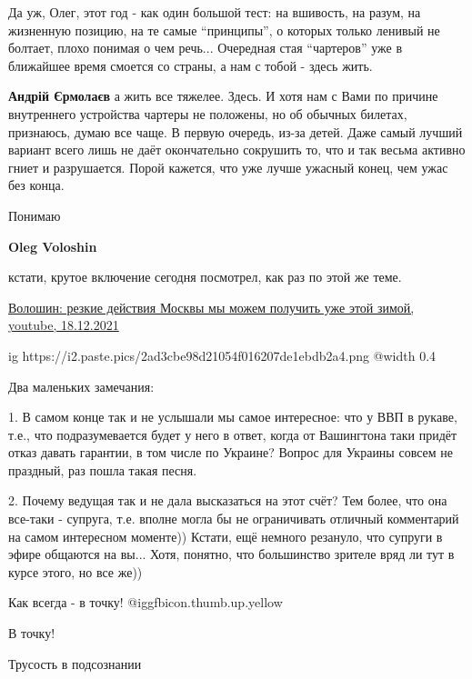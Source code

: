  
 
 
 
 
\zzSecCmt

\begin{itemize} %

Да уж, Олег, этот год - как один большой тест: на вшивость, на разум, на
жизненную позицию, на те самые \enquote{принципы}, о которых только ленивый не болтает,
плохо понимая о чем речь... Очередная стая \enquote{чартеров} уже в ближайшее время
смоется со страны, а нам с тобой - здесь жить.

\begin{itemize} %
\textbf{Андрій Єрмолаєв} а жить все тяжелее. Здесь. И хотя нам с Вами по причине внутреннего устройства чартеры не положены, но об обычных билетах, признаюсь, думаю все чаще. В первую очередь, из-за детей. Даже самый лучший вариант всего лишь не даёт окончательно сокрушить то, что и так весьма активно гниет и разрушается. Порой кажется, что уже лучше ужасный конец, чем ужас без конца.

Понимаю

\textbf{Oleg Voloshin} 

кстати, крутое включение сегодня посмотрел, как раз по этой же теме. 

\href{https://youtu.be/XO9veCwBDCs}{%
Волошин: резкие действия Москвы мы можем получить уже этой зимой, youtube, 18.12.2021%
}

\ifcmt
  ig https://i2.paste.pics/2ad3cbe98d21054f016207de1ebdb2a4.png
  @width 0.4
\fi

Два маленьких замечания:

1. В самом конце так и не услышали мы самое интересное: что у ВВП в рукаве,
т.е., что подразумевается будет у него в ответ, когда от Вашингтона таки придёт
отказ давать гарантии, в том числе по Украине? Вопрос для Украины совсем не
праздный, раз пошла такая песня.

2. Почему ведущая так и не дала высказаться на этот счёт? Тем более, что она
все-таки - супруга, т.е. вполне могла бы не ограничивать отличный комментарий
на самом интересном моменте)) Кстати, ещё немного резануло, что супруги в эфире
общаются на вы... Хотя, понятно, что большинство зрителе вряд ли тут в курсе
этого, но все же))

\end{itemize} %

Как всегда - в точку!  @igg{fbicon.thumb.up.yellow} 

В точку!

Трусость в подсознании

\end{itemize} %
